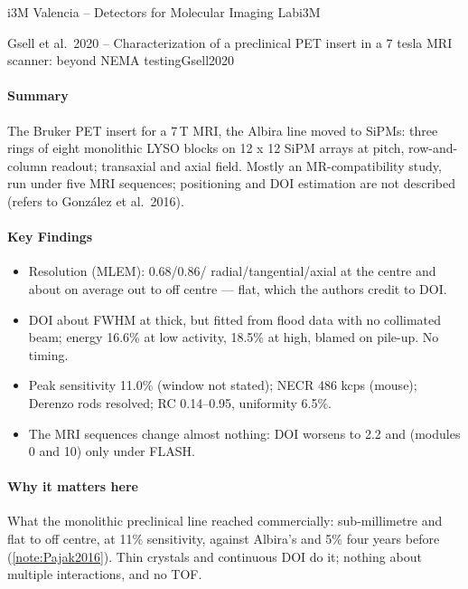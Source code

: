\begin{programnote}{i3M Valencia -- Detectors for Molecular Imaging Lab}{i3M}
\begin{papernote}{Gsell et al.\ 2020 -- Characterization of a preclinical PET insert in a 7 tesla MRI scanner: beyond NEMA testing}{Gsell2020}
\paragraph{Summary}
The Bruker PET insert for a 7\,T MRI, the Albira line moved to SiPMs: three
rings of eight  monolithic LYSO blocks on 12 x 12
SiPM arrays at  pitch, row-and-column readout;  transaxial and
 axial field. Mostly an MR-compatibility study, run under five MRI
sequences; positioning and DOI estimation are not described (refers to
González et al.\ 2016).

\paragraph{Key Findings}
\begin{itemize}
	\item Resolution (MLEM): 0.68/0.86/ radial/tangential/axial at the
		centre and about  on average out to  off centre --- flat,
		which the authors credit to DOI.
	\item DOI about  FWHM at  thick, but fitted from flood data
		with no collimated beam; energy 16.6\% at low activity, 18.5\% at high,
		blamed on pile-up. No timing.
	\item Peak sensitivity 11.0\% (window not stated); NECR 486 kcps (mouse);
		 Derenzo rods resolved; RC 0.14--0.95, uniformity 6.5\%.
	\item The MRI sequences change almost nothing: DOI worsens to 2.2 and
		 (modules 0 and 10) only under FLASH.
\end{itemize}

\paragraph{Why it matters here}
What the monolithic preclinical line reached commercially: sub-millimetre and
flat to  off centre, at 11\% sensitivity, against Albira's  and
5\% four years before (\ref{note:Pajak2016}). Thin crystals and continuous DOI
do it; nothing about multiple interactions, and no TOF.


\end{papernote}
\end{programnote}
